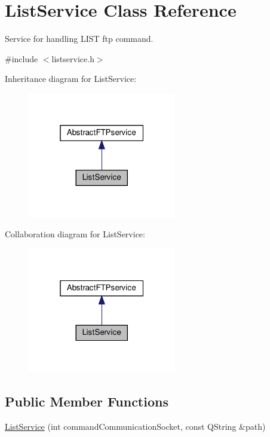 \hypertarget{classListService}{}\section{List\+Service Class Reference}
\label{classListService}


Service for handling L\+I\+ST ftp command.  




{\ttfamily \#include $<$listservice.\+h$>$}



Inheritance diagram for List\+Service\+:\nopagebreak
\begin{figure}[H]
\begin{center}
\leavevmode
\includegraphics[width=184pt]{d2/da6/classListService__inherit__graph}
\end{center}
\end{figure}


Collaboration diagram for List\+Service\+:\nopagebreak
\begin{figure}[H]
\begin{center}
\leavevmode
\includegraphics[width=184pt]{d7/d8f/classListService__coll__graph}
\end{center}
\end{figure}
\subsection*{Public Member Functions}
\begin{DoxyCompactItemize}
\item 
\hyperlink{classListService_ae7007649faedef397ea6cc4896675e97}{List\+Service} (int command\+Communication\+Socket, const Q\+String \&path)
\end{DoxyCompactItemize}
